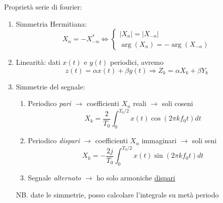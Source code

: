 Proprietà serie di fourier:
\begin{enumerate}
	\item Simmetria Hermitiana:
	      \[
		      X_n=-X_{-n}^* \Leftrightarrow\left\{\begin{array}{l}
			      \left|X_n\right|=\left|X_{-n}\right| \\
			      \arg \left(X_n\right)=-\arg \left(X_{-n}\right)
		      \end{array}\right.
	      \]

	\item Linearità: dati $x(t)$ e $y(t)$ periodici, avremo
	      \[
		      z(t)=\alpha x(t)+\beta y(t) \Rightarrow Z_k=\alpha X_k+\beta Y_k
	      \]
	\item Simmetrie del segnale:
	      \begin{enumerate}
		      \item Periodico \textit{pari} $ \rightarrow $ coefficienti $X_n$ reali $ \rightarrow  $ soli coseni
		            \[
			            X_k=\frac{2}{T_0} \int_0^{T_0 / 2} x(t) \cos \left(2 \pi k f_0 t\right) d t
		            \]
		      \item  Periodico \textit{dispari} $ \rightarrow $ coefficienti $X_n$ immaginari $ \rightarrow  $ soli seni
		            \[
			            X_k=-\frac{2 j}{T_0} \int_0^{T_0 / 2} x(t) \sin \left(2 \pi k f_0 t\right) d t
		            \]
		      \item Segnale \textit{alternato} $ \rightarrow  $ ho solo armoniche \underline{dispari}
	      \end{enumerate}
	      NB. date le simmetrie, posso calcolare l'integrale su metà periodo
\end{enumerate}

